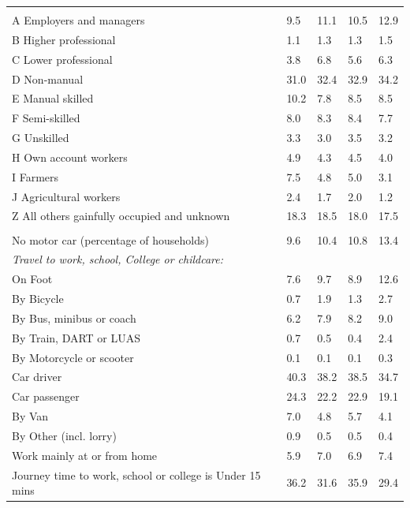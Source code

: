 \documentclass{article}
\begin{document}
\begin{table}[h]
\begin{tabular}{KTTTT}
\hline
    \\ 
    \hline
A Employers and managers &  9.5& 11.1& 10.5& 12.9\\
B Higher professional & 1.1& 1.3& 1.3& 1.5\\
C Lower professional & 3.8& 6.8& 5.6& 6.3\\
D Non-manual & 31.0& 32.4& 32.9& 34.2\\
E Manual skilled & 10.2&  7.8&  8.5&  8.5\\
F Semi-skilled & 8.0& 8.3& 8.4& 7.7\\
G Unskilled & 3.3& 3.0& 3.5& 3.2\\
H Own account workers & 4.9& 4.3& 4.5& 4.0\\
I Farmers & 7.5& 4.8& 5.0& 3.1\\
J Agricultural workers & 2.4& 1.7& 2.0& 1.2\\
Z All others gainfully occupied and unknown & 18.3& 18.5& 18.0& 17.5\\
\hline
{}\hline
    \\ 
    \hline
No motor car (percentage of households) &  9.6& 10.4& 10.8& 
13.4\\
    \hline 
\emph{Travel to work, school, College or childcare:} & & & \\
\quad On Foot &  7.6&  9.7&  8.9& 12.6\\ 
\quad By Bicycle & 0.7& 1.9& 1.3& 2.7\\ 
\quad By Bus, minibus or coach & 6.2& 7.9& 8.2& 9.0\\
\quad By Train, DART or LUAS & 0.7& 0.5& 0.4& 2.4\\
\quad By Motorcycle or scooter & 0.1& 0.1& 0.1& 0.3\\
\quad Car driver & 40.3 & 38.2& 38.5& 34.7\\
\quad Car passenger & 24.3& 22.2& 22.9& 19.1\\
\quad By Van & 7.0& 4.8& 5.7& 4.1\\
\quad By Other (incl. lorry) & 0.9& 0.5& 0.5& 0.4\\
    \hline
Work mainly at or from home & 5.9& 7.0& 6.9& 7.4\\
Journey time to work, school or college is Under 15 mins & 36.2& 31.6& 35.9& 29.4\\

\end{tabular}
\end{table}
\end{document}
